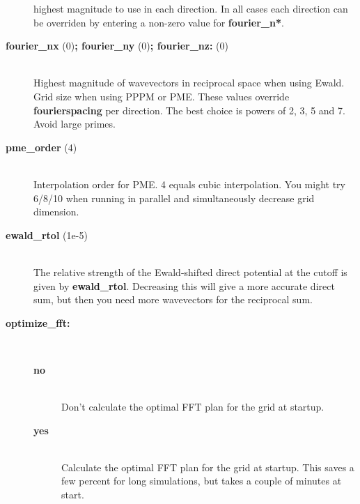 \begin{description}
highest magnitude to use in each direction. In all cases
each direction can be overriden by entering a non-zero value for
{\bf fourier\_n*}. 
\item[{\bf fourier\_nx }(0){\bf  ; fourier\_ny }(0){\bf  ; fourier\_nz: }(0)]\mbox{}\\
Highest magnitude of wavevectors in reciprocal space when using Ewald.
Grid size when using PPPM or PME. These values override
{\bf fourierspacing} per direction. The best choice is powers of
2, 3, 5 and 7. Avoid large primes.
\item[{\bf pme\_order }(4)]\mbox{}\\
Interpolation order for PME. 4 equals cubic interpolation. You might try
6/8/10 when running in parallel and simultaneously decrease grid dimension.
\item[{\bf ewald\_rtol }(1e-5)]\mbox{}\\
The relative strength of the Ewald-shifted direct potential at the cutoff
is given by {\bf ewald\_rtol}. Decreasing this will give a more accurate
direct sum, but then you need more wavevectors for the reciprocal sum.
\item[{\bf optimize\_fft:}]\mbox{}\\
\vspace{-2ex}\begin{description}
\item[{\bf no}]\mbox{}\\
Don't calculate the optimal FFT plan for the grid at startup.
\item[{\bf yes}]\mbox{}\\
Calculate the optimal FFT plan for the grid at startup. This saves a
few percent for long simulations, but takes a couple of minutes
at start.
\end{description}
\end{description}

